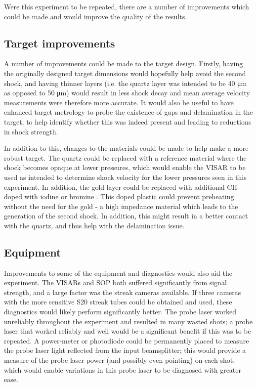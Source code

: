 Were this experiment to be repeated, there are a number of improvements which could be made and would improve the quality of the results.

\subsection{Target improvements}
A number of improvements could be made to the target design. Firstly, having the originally designed target dimensions would hopefully help avoid the second shock, and having thinner layers (i.e. the quartz layer was intended to be 40 \unit{\micro\meter} as opposed to 50 \unit{\micro\meter}) would result in less shock decay and mean average velocity measurements were therefore more accurate. It would also be useful to have enhanced target metrology to probe the existence of gaps and delamination in the target, to help identify whether this was indeed present and leading to reductions in shock strength.

In addition to this, changes to the materials could be made to help make a more robust target. The quartz could be replaced with a reference material where the shock becomes opaque at lower pressures, which would enable the VISAR to be used as intended to determine shock velocity for the lower pressures seen in this experiment. In addition, the gold layer could be replaced with additional CH doped with iodine or bromine \cite{Desjardins2021}. This doped plastic could prevent preheating without the need for the gold - a high impedance material which leads to the generation of the second shock. In addition, this might result in a better contact with the quartz, and thus help with the delamination issue.

\subsection{Equipment}
Improvements to some of the equipment and diagnostics would also aid the experiment. The VISARs and SOP both suffered significantly from signal strength, and a large factor was the streak cameras available. If three cameras with the more sensitive S20 streak tubes could be obtained and used, these diagnostics would likely perform significantly better. The probe laser worked unreliably throughout the experiment and resulted in many wasted shots; a probe laser that worked reliably and well would be a significant benefit if this was to be repeated. A power-meter or photodiode could be permanently placed to measure the probe laser light reflected from the input beamsplitter; this would provide a measure of the probe laser power (and possibly even pointing) on each shot, which would enable variations in this probe laser to be diagnosed with greater ease.

